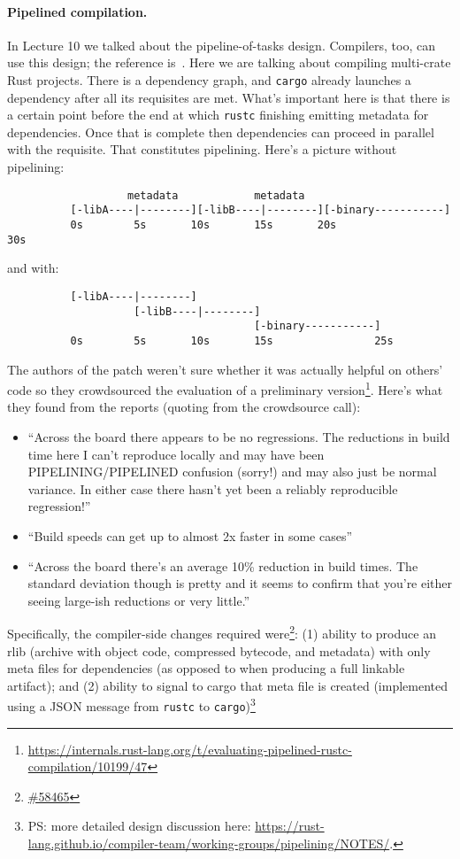 \paragraph{Pipelined compilation.} In Lecture 10 we talked about the pipeline-of-tasks
design. Compilers, too, can use this design; the reference is~\cite{nethercote19b:_how_rust}.
Here we are talking about compiling multi-crate Rust projects. There is a dependency graph,
and \texttt{cargo} already launches a dependency after all its requisites are met.
What's important here is that there is a certain point before the end at which \texttt{rustc}
finishing emitting
metadata for dependencies. Once that is complete then dependencies can proceed in parallel with the
requisite. That constitutes pipelining. Here's a picture without pipelining:
\begin{verbatim}
                   metadata            metadata
          [-libA----|--------][-libB----|--------][-binary-----------]
          0s        5s       10s       15s       20s                30s
\end{verbatim}
and with:
\begin{verbatim}
          [-libA----|--------]
                    [-libB----|--------]
                                       [-binary-----------]
          0s        5s       10s       15s                25s
\end{verbatim}
The authors of the patch weren't sure whether it was actually helpful on others' code so they crowdsourced the evaluation
of a preliminary version\footnote{\url{https://internals.rust-lang.org/t/evaluating-pipelined-rustc-compilation/10199/47}}.
Here's what they found from the reports (quoting from the crowdsource call):
\begin{itemize}[noitemsep]
\item    ``Across the board there appears to be no regressions. The reductions in build time here I can’t reproduce locally and may have been PIPELINING/PIPELINED confusion (sorry!) and may also just be normal variance. In either case there hasn’t yet been a reliably reproducible regression!''
\item    ``Build speeds can get up to almost 2x faster in some cases''
\item    ``Across the board there’s an average 10\% reduction in build times. The standard deviation though is pretty and it seems to confirm that you’re either seeing large-ish reductions or very little.''
\end{itemize}
Specifically, the compiler-side changes required were\footnote{\href{https://github.com/rust-lang/rust/issues/58465}{\#58465}}: (1) ability to produce an rlib (archive with object code, compressed bytecode, and metadata) with only meta files for dependencies
(as opposed to when producing a full linkable artifact); and (2) ability to signal to cargo that meta file is created
(implemented using a JSON message from \texttt{rustc} to \texttt{cargo})\footnote{PS: more detailed design discussion here: \url{https://rust-lang.github.io/compiler-team/working-groups/pipelining/NOTES/}.}

